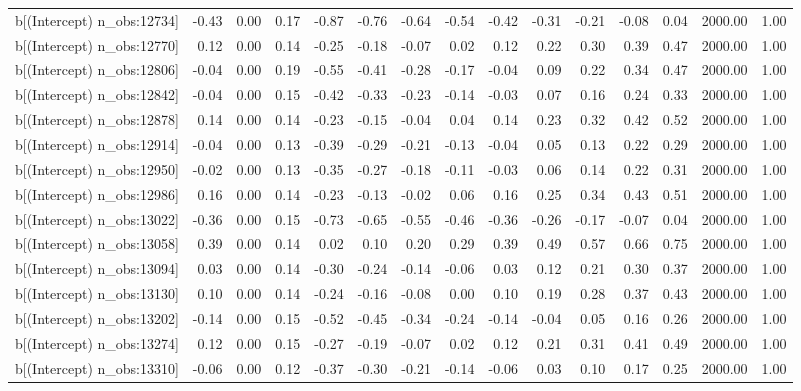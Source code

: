 \begin{table}[ht]
\begin{tabular}{rrrrrrrrrrrrrrr}
  b[(Intercept) n\_obs:12734] & -0.43 & 0.00 & 0.17 & -0.87 & -0.76 & -0.64 & -0.54 & -0.42 & -0.31 & -0.21 & -0.08 & 0.04 & 2000.00 & 1.00 \\ 
  b[(Intercept) n\_obs:12770] & 0.12 & 0.00 & 0.14 & -0.25 & -0.18 & -0.07 & 0.02 & 0.12 & 0.22 & 0.30 & 0.39 & 0.47 & 2000.00 & 1.00 \\ 
  b[(Intercept) n\_obs:12806] & -0.04 & 0.00 & 0.19 & -0.55 & -0.41 & -0.28 & -0.17 & -0.04 & 0.09 & 0.22 & 0.34 & 0.47 & 2000.00 & 1.00 \\ 
  b[(Intercept) n\_obs:12842] & -0.04 & 0.00 & 0.15 & -0.42 & -0.33 & -0.23 & -0.14 & -0.03 & 0.07 & 0.16 & 0.24 & 0.33 & 2000.00 & 1.00 \\ 
  b[(Intercept) n\_obs:12878] & 0.14 & 0.00 & 0.14 & -0.23 & -0.15 & -0.04 & 0.04 & 0.14 & 0.23 & 0.32 & 0.42 & 0.52 & 2000.00 & 1.00 \\ 
  b[(Intercept) n\_obs:12914] & -0.04 & 0.00 & 0.13 & -0.39 & -0.29 & -0.21 & -0.13 & -0.04 & 0.05 & 0.13 & 0.22 & 0.29 & 2000.00 & 1.00 \\ 
  b[(Intercept) n\_obs:12950] & -0.02 & 0.00 & 0.13 & -0.35 & -0.27 & -0.18 & -0.11 & -0.03 & 0.06 & 0.14 & 0.22 & 0.31 & 2000.00 & 1.00 \\ 
  b[(Intercept) n\_obs:12986] & 0.16 & 0.00 & 0.14 & -0.23 & -0.13 & -0.02 & 0.06 & 0.16 & 0.25 & 0.34 & 0.43 & 0.51 & 2000.00 & 1.00 \\ 
  b[(Intercept) n\_obs:13022] & -0.36 & 0.00 & 0.15 & -0.73 & -0.65 & -0.55 & -0.46 & -0.36 & -0.26 & -0.17 & -0.07 & 0.04 & 2000.00 & 1.00 \\ 
  b[(Intercept) n\_obs:13058] & 0.39 & 0.00 & 0.14 & 0.02 & 0.10 & 0.20 & 0.29 & 0.39 & 0.49 & 0.57 & 0.66 & 0.75 & 2000.00 & 1.00 \\ 
  b[(Intercept) n\_obs:13094] & 0.03 & 0.00 & 0.14 & -0.30 & -0.24 & -0.14 & -0.06 & 0.03 & 0.12 & 0.21 & 0.30 & 0.37 & 2000.00 & 1.00 \\ 
  b[(Intercept) n\_obs:13130] & 0.10 & 0.00 & 0.14 & -0.24 & -0.16 & -0.08 & 0.00 & 0.10 & 0.19 & 0.28 & 0.37 & 0.43 & 2000.00 & 1.00 \\ 
  b[(Intercept) n\_obs:13202] & -0.14 & 0.00 & 0.15 & -0.52 & -0.45 & -0.34 & -0.24 & -0.14 & -0.04 & 0.05 & 0.16 & 0.26 & 2000.00 & 1.00 \\ 
  b[(Intercept) n\_obs:13274] & 0.12 & 0.00 & 0.15 & -0.27 & -0.19 & -0.07 & 0.02 & 0.12 & 0.21 & 0.31 & 0.41 & 0.49 & 2000.00 & 1.00 \\ 
  b[(Intercept) n\_obs:13310] & -0.06 & 0.00 & 0.12 & -0.37 & -0.30 & -0.21 & -0.14 & -0.06 & 0.03 & 0.10 & 0.17 & 0.25 & 2000.00 & 1.00 \\ 

\end{tabular}
\end{table}
